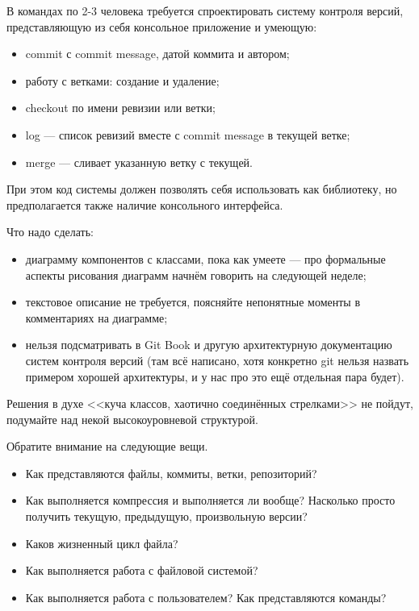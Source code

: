 \documentclass{../../text-style}
\begin{document}
\maketitle
\thispagestyle{empty}

В командах по 2-3 человека требуется спроектировать систему контроля версий, представляющую из себя консольное приложение и умеющую:

\begin{itemize}
    \item commit с commit message, датой коммита и автором;
    \item работу с ветками: создание и удаление;
    \item checkout по имени ревизии или ветки;
    \item log --- список ревизий вместе с commit message в текущей ветке;
    \item merge --- сливает указанную ветку с текущей.
\end{itemize}

При этом код системы должен позволять себя использовать как библиотеку, но предполагается также наличие консольного интерфейса.

Что надо сделать:

\begin{itemize}
    \item диаграмму компонентов с классами, пока как умеете --- про формальные аспекты рисования диаграмм начнём говорить на следующей неделе;
    \item текстовое описание не требуется, поясняйте непонятные моменты в комментариях на диаграмме;
    \item нельзя подсматривать в Git Book и другую архитектурную документацию систем контроля версий (там всё написано, хотя конкретно git нельзя назвать примером хорошей архитектуры, и у нас про это ещё отдельная пара будет).
\end{itemize}

Решения в духе <<куча классов, хаотично соединённых стрелками>> не пойдут, подумайте над некой высокоуровневой структурой.

Обратите внимание на следующие вещи.

\begin{itemize}
    \item Как представляются файлы, коммиты, ветки, репозиторий?
    \item Как выполняется компрессия и выполняется ли вообще? Насколько просто получить текущую, предыдущую, произвольную версии?
    \item Каков жизненный цикл файла?
    \item Как выполняется работа с файловой системой?
    \item Как выполняется работа с пользователем? Как представляются команды?
\end{itemize}
\end{document}
